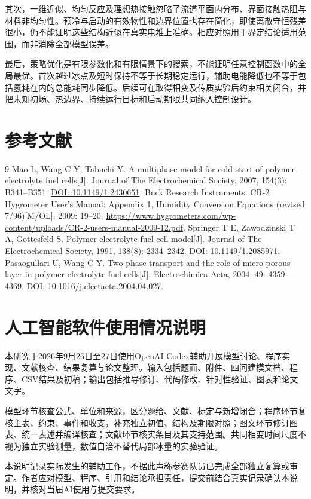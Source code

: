 \documentclass[bwprint]{gmcmthesis}
\numberwithin{equation}{section}
\numberwithin{figure}{section}
\begin{document}
其次，一维近似、均匀反应及理想热接触忽略了流道平面内分布、界面接触热阻与材料非均匀性。预冷与启动的有效物性和边界位置也存在简化，即使离散守恒残差很小，仍不能证明这些结构近似在真实电堆上准确。相应对照用于界定结论适用范围，而非消除全部模型误差。

\begin{samepage}
最后，策略优化是有限参数化和有限情景下的搜索，不能证明任意控制函数中的全局最优。首次越过冰点及短时保持不等于长期稳定运行，辅助电能降低也不等于包括氢耗在内的总能耗同步降低。后续可在取得相变及传质实验后约束相关闭合，并把未知初场、热边界、持续运行目标和启动期限共同纳入控制设计。\par
\end{samepage}

\section{参考文献}
\begin{thebibliography}{9}
\setlength{\itemsep}{1mm}
 Mao L, Wang C Y, Tabuchi Y. A multiphase model for cold start of polymer electrolyte fuel cells[J]. Journal of The Electrochemical Society, 2007, 154(3): B341--B351. \href{https://doi.org/10.1149/1.2430651}{DOI: 10.1149/1.2430651}.
 Buck Research Instruments. CR-2 Hygrometer User's Manual: Appendix 1, Humidity Conversion Equations (revised 7/96)[M/OL]. 2009: 19--20. \url{https://www.hygrometers.com/wp-content/uploads/CR-2-users-manual-2009-12.pdf}.
 Springer T E, Zawodzinski T A, Gottesfeld S. Polymer electrolyte fuel cell model[J]. Journal of The Electrochemical Society, 1991, 138(8): 2334--2342. \href{https://doi.org/10.1149/1.2085971}{DOI: 10.1149/1.2085971}.
 Pasaogullari U, Wang C Y. Two-phase transport and the role of micro-porous layer in polymer electrolyte fuel cells[J]. Electrochimica Acta, 2004, 49: 4359--4369. \href{https://doi.org/10.1016/j.electacta.2004.04.027}{DOI: 10.1016/j.electacta.2004.04.027}.
\end{thebibliography}

\appendix
\renewcommand{\theHsection}{appendix.\Alph{section}}
\section{人工智能软件使用情况说明}

本研究于2026年9月26日至27日使用OpenAI Codex辅助开展模型讨论、程序实现、文献核查、结果复算与论文整理。输入包括题面、附件、四问建模文档、程序、CSV结果及初稿；输出包括推导修订、代码修改、针对性验证、图表和论文文字。

模型环节核查公式、单位和来源，区分题给、文献、标定与新增闭合；程序环节复核主表、约束、事件和收支，补充独立初值、结构及期限对照；图文环节修订图表、统一表述并编译核查；文献环节核实条目及其支持范围。共同相变时间尺度不视为独立实验测量，数值自洽不替代局部冰量的实验验证。

本说明记录实际发生的辅助工作，不据此声称参赛队员已完成全部独立复算或审定。作者应对模型、程序、引用和结论承担责任，提交前结合真实记录确认本说明，并核对当届AI使用与提交要求。
\end{document}
